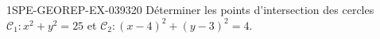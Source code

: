 \begin{exercice}{1SPE-GEOREP-EX-039}{3}{20}
Déterminer les points d'intersection des cercles $\mathcal{C}_1 : x^2 + y^2 = 25$ et $\mathcal{C}_2 : (x-4)^2 + (y-3)^2 = 4$.
\end{exercice}
